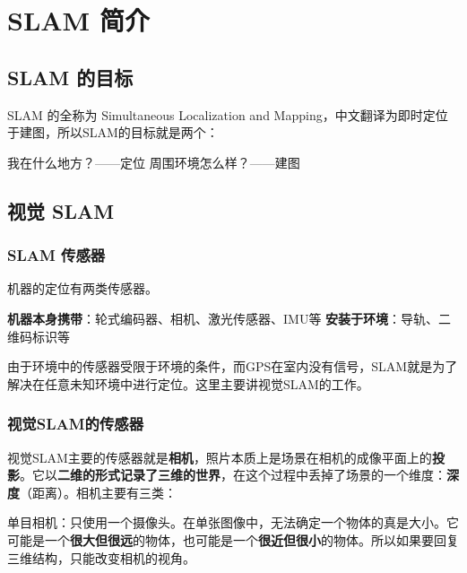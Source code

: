 \chapter{SLAM 简介}
\section{SLAM 的目标}
SLAM 的全称为 Simultaneous Localization and Mapping，中文翻译为即时定位于建图，所以SLAM的目标就是两个：

\noa[1] 我在什么地方？——定位
\noa[2] 周围环境怎么样？——建图

\section{视觉 SLAM}
\subsection{SLAM 传感器}
机器的定位有两类传感器。

\noa[1] \textbf{机器本身携带}：轮式编码器、相机、激光传感器、IMU等
\noa[2] \textbf{安装于环境}：导轨、二维码标识等

由于环境中的传感器受限于环境的条件，而GPS在室内没有信号，SLAM就是为了解决在任意未知环境中进行定位。这里主要讲视觉SLAM的工作。

\subsection{视觉SLAM的传感器}

视觉SLAM主要的传感器就是\textbf{相机}，照片本质上是场景在相机的成像平面上的\textbf{投影}。它以\textbf{二维的形式记录了三维的世界}，在这个过程中丢掉了场景的一个维度：\textbf{深度}（距离）。相机主要有三类：

\noa[1] 单目相机：只使用一个摄像头。在单张图像中，无法确定一个物体的真是大小。它可能是一个\textbf{很大但很远}的物体，也可能是一个\textbf{很近但很小}的物体。所以如果要回复三维结构，只能改变相机的视角。
\noa[2] 
